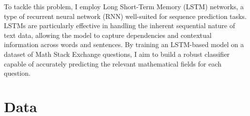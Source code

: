 \documentclass[12pt, letterpaper]{article}
\begin{document}
\par To tackle this problem, I employ Long Short-Term Memory (LSTM) networks, a type of recurrent neural network (RNN) well-suited for sequence prediction tasks. LSTMs are particularly effective in handling the inherent sequential nature of text data, allowing the model to capture dependencies and contextual information across words and sentences. By training an LSTM-based model on a dataset of Math Stack Exchange questions, I aim to build a robust classifier capable of accurately predicting the relevant mathematical fields for each question.






\section{Data}
\end{document}
